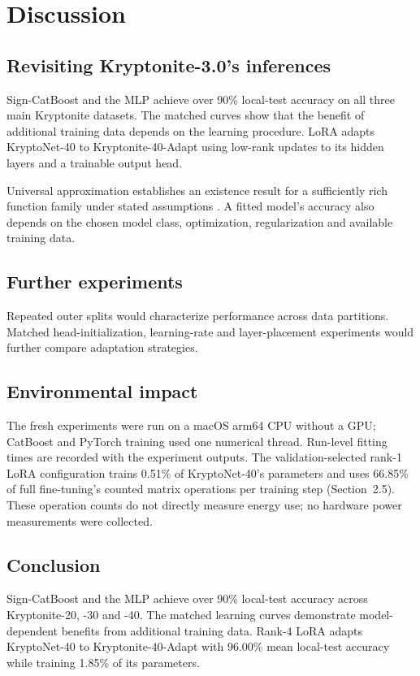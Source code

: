 \documentclass{article}
\begin{document}
\section{Discussion}
\subsection{Revisiting Kryptonite-3.0's inferences}
Sign-CatBoost and the MLP achieve over 90\% local-test accuracy on all three main Kryptonite datasets. The matched curves show that the benefit of additional training data depends on the learning procedure. LoRA adapts KryptoNet-40 to Kryptonite-40-Adapt using low-rank updates to its hidden layers and a trainable output head.

Universal approximation establishes an existence result for a sufficiently rich function family under stated assumptions \cite{leshno1993}. A fitted model's accuracy also depends on the chosen model class, optimization, regularization and available training data.

\subsection{Further experiments}
Repeated outer splits would characterize performance across data partitions. Matched head-initialization, learning-rate and layer-placement experiments would further compare adaptation strategies.

\newpage
\subsection{Environmental impact}
The fresh experiments were run on a macOS arm64 CPU without a GPU; CatBoost and PyTorch training used one numerical thread. Run-level fitting times are recorded with the experiment outputs. The validation-selected rank-1 LoRA configuration trains 0.51\% of KryptoNet-40's parameters and uses 66.85\% of full fine-tuning's counted matrix operations per training step (Section~2.5). These operation counts do not directly measure energy use; no hardware power measurements were collected.

\begin{samepage}
\subsection{Conclusion}
Sign-CatBoost and the MLP achieve over 90\% local-test accuracy across Kryptonite-20, -30 and -40. The matched learning curves demonstrate model-dependent benefits from additional training data. Rank-4 LoRA adapts KryptoNet-40 to Kryptonite-40-Adapt with 96.00\% mean local-test accuracy while training 1.85\% of its parameters.

\end{samepage}
\end{document}
